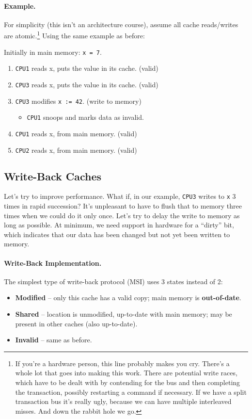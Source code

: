 \paragraph{Example.} For simplicity (this isn't an architecture course), assume all cache
      reads/writes are atomic.\footnote{If you're a hardware person, this line probably makes you cry. There's a whole lot that goes into making this work. There are potential write races, which have to be dealt with by contending for the bus and then completing the transaction, possibly restarting a command if necessary. If we have a split transaction bus it's really ugly, because we can have multiple interleaved misses. And down the rabbit hole we go.} Using the same example as before:

Initially in main memory: {\tt x = 7}.

  \begin{enumerate}[noitemsep]
    \item {\tt CPU1} reads x, puts the value in its cache. {(valid)}
    \item {\tt CPU3} reads x, puts the value in its cache. {(valid)}
    \item {\tt CPU3} modifies {\tt x := 42}. {(write to memory)}
      \begin{itemize}[noitemsep]
        \item {{\tt CPU1} snoops and marks data as invalid.}
      \end{itemize}
    \item {\tt CPU1} reads x, {from main memory. (valid)}
    \item {\tt CPU2} reads x, {from main memory. (valid)}
  \end{enumerate}

\subsection*{Write-Back Caches}
Let's try to improve performance. What if, in our example, {\tt CPU3} writes to {\tt x} 3 times in rapid succession? It's unpleasant to have to flush that to memory three times when we could do it only once. Let's try to delay the write to memory as long as possible. At minimum, we need support in hardware for a ``dirty'' bit, which indicates that our data has been changed but not yet been written to memory.

\paragraph{Write-Back Implementation.}
     The simplest type of write-back protocol (MSI) uses 3 states instead of 2:
      \begin{itemize}[noitemsep]
        \item {\bf Modified} -- only this cache has a valid copy; 
          main memory is {\bf out-of-date}.
        \item {\bf Shared} -- location is unmodified, 
           up-to-date with main
          memory; 
          \quad may be present in other caches (also up-to-date).
        \item {\bf Invalid} -- same as before.
      \end{itemize}
      
